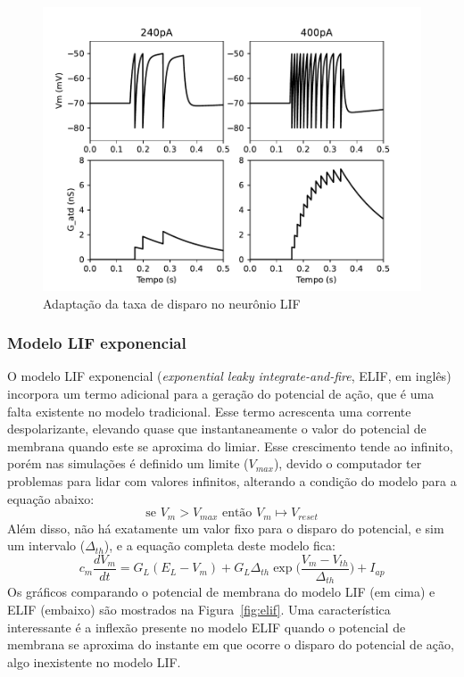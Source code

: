 \begin{figure}[tb]
	\centering
	\caption{Adaptação da taxa de disparo no neurônio LIF}
	\label{fig:lifatd}
	\includegraphics[width=0.7\linewidth]{figs/lif_atd}
\end{figure}

\subsubsection{Modelo LIF exponencial}
O modelo LIF exponencial (\textit{exponential leaky integrate-and-fire}, ELIF, em inglês) incorpora um termo adicional para a geração do potencial de ação, que é uma falta existente no modelo tradicional. Esse termo acrescenta uma corrente despolarizante, elevando quase que instantaneamente o valor do potencial de membrana quando este se aproxima do limiar. Esse crescimento tende ao infinito, porém nas simulações é definido um limite ($V_{max}$), devido o computador ter problemas para lidar com valores infinitos, alterando a condição do modelo para a equação abaixo:
\begin{equation}\label{eq:elif_cond}
	\text{se } V_m > V_{max} \text{ então } V_m\mapsto V_{reset}
\end{equation}
Além disso, não há exatamente um valor fixo para o disparo do potencial, e sim um intervalo ($\Delta_{th}$), e a equação completa deste modelo fica:
\begin{equation}\label{eq:elif}
	c_m\frac{dV_m}{dt} = G_L(E_L-V_m) + G_L\Delta_{th}\exp\Big(\frac{V_m-V_{th}}{\Delta_{th}}\Big) + I_{ap}
\end{equation}
Os gráficos comparando o potencial de membrana do modelo LIF (em cima) e ELIF (embaixo) são mostrados na Figura~\ref{fig:elif}. Uma característica interessante é a inflexão presente no modelo ELIF quando o potencial de membrana se aproxima do instante em que ocorre o disparo do potencial de ação, algo inexistente no modelo LIF.

